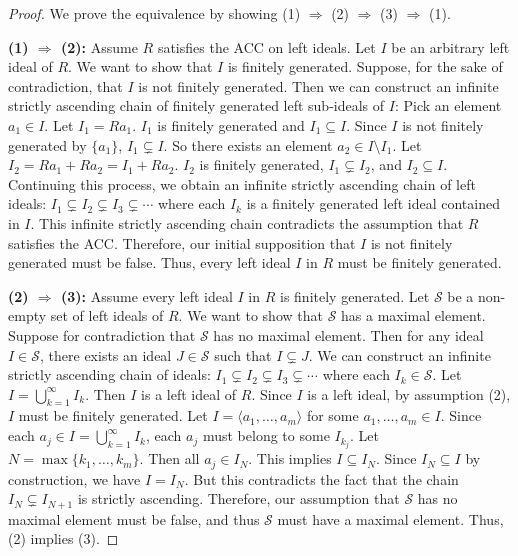 \documentclass[12pt]{article}
\theoremstyle{definition}
\numberwithin{equation}{subsection}
\begin{document}
\begin{proof}
We prove the equivalence by showing (1) $\Rightarrow$ (2) $\Rightarrow$ (3) $\Rightarrow$ (1).

\textbf{(1) $\Rightarrow$ (2):} Assume $R$ satisfies the ACC on left ideals. Let $I$ be an arbitrary left ideal of $R$. We want to show that $I$ is finitely generated.
Suppose, for the sake of contradiction, that $I$ is not finitely generated.
Then we can construct an infinite strictly ascending chain of finitely generated left sub-ideals of $I$:
Pick an element $a_1 \in I$. Let $I_1 = Ra_1$. $I_1$ is finitely generated and $I_1 \subseteq I$.
Since $I$ is not finitely generated by $\{a_1\}$, $I_1 \subsetneq I$. So there exists an element $a_2 \in I \setminus I_1$. Let $I_2 = Ra_1 + Ra_2 = I_1 + Ra_2$. $I_2$ is finitely generated, $I_1 \subsetneq I_2$, and $I_2 \subseteq I$.
Continuing this process, we obtain an infinite strictly ascending chain of left ideals:
$I_1 \subsetneq I_2 \subsetneq I_3 \subsetneq \cdots$
where each $I_k$ is a finitely generated left ideal contained in $I$.
This infinite strictly ascending chain contradicts the assumption that $R$ satisfies the ACC.
Therefore, our initial supposition that $I$ is not finitely generated must be false.
Thus, every left ideal $I$ in $R$ must be finitely generated.

\textbf{(2) $\Rightarrow$ (3):} Assume every left ideal $I$ in $R$ is finitely generated. Let $\mathcal{S}$ be a non-empty set of left ideals of $R$. We want to show that $\mathcal{S}$ has a maximal element. Suppose for contradiction that $\mathcal{S}$ has no maximal element. Then for any ideal $I \in \mathcal{S}$, there exists an ideal $J \in \mathcal{S}$ such that $I \subsetneq J$. We can construct an infinite strictly ascending chain of ideals:
$I_1 \subsetneq I_2 \subsetneq I_3 \subsetneq \cdots$
where each $I_k \in \mathcal{S}$. Let $I = \bigcup_{k=1}^{\infty} I_k$. Then $I$ is a left ideal of $R$. Since $I$ is a left ideal, by assumption (2), $I$ must be finitely generated. Let $I = \langle a_1, \ldots, a_m \rangle$ for some $a_1, \ldots, a_m \in I$. Since each $a_j \in I = \bigcup_{k=1}^{\infty} I_k$, each $a_j$ must belong to some $I_{k_j}$. Let $N = \max\{k_1, \ldots, k_m\}$. Then all $a_j \in I_N$. This implies $I \subseteq I_N$. Since $I_N \subseteq I$ by construction, we have $I = I_N$. But this contradicts the fact that the chain $I_N \subsetneq I_{N+1}$ is strictly ascending. Therefore, our assumption that $\mathcal{S}$ has no maximal element must be false, and thus $\mathcal{S}$ must have a maximal element. Thus, (2) implies (3).


\end{proof}
\end{document}
